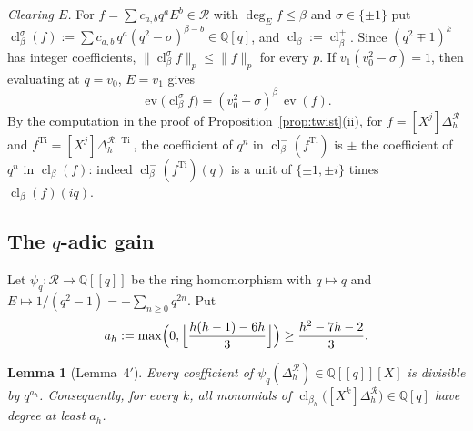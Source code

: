 \documentclass[11pt]{amsart}
\newtheorem{lemma}[theorem]{Lemma}
\theoremstyle{definition}
\theoremstyle{remark}
\numberwithin{equation}{section}
\newcommand{\QQ}{\mathbb{Q}}
\newcommand{\cR}{\mathcal{R}}
\newcommand{\Ti}{\operatorname{Ti}}
\newcommand{\Ed}{\deg_E}
\newcommand{\cl}{\operatorname{cl}}
\newcommand{\ev}{\operatorname{ev}}
\begin{document}
\emph{Clearing $E$.} For $f=\sum c_{a,b}q^aE^b\in\cR$ with $\Ed f\le\beta$ and $\sigma\in\{\pm1\}$ put
$\cl^\sigma_\beta(f):=\sum c_{a,b}\,q^a(q^2-\sigma)^{\beta-b}\in\QQ[q]$, and $\cl_\beta:=\cl^{+}_\beta$. Since
$(q^2\mp1)^k$ has integer coefficients, $\|\cl^\sigma_\beta f\|_p\le\|f\|_p$ for every $p$. If $v_1(v_0^2-\sigma)=1$,
then evaluating at $q=v_0$, $E=v_1$ gives
\begin{equation}\label{eq:clear}
  \ev\bigl(\cl^\sigma_\beta f\bigr)=(v_0^2-\sigma)^\beta\,\ev(f).
\end{equation}
By the computation in the proof of Proposition~\ref{prop:twist}(ii), for $f=[X^j]\Delta^{\cR}_h$ and
$f^{\Ti}=[X^j]\Delta^{\cR,\Ti}_h$, the coefficient of $q^n$ in $\cl^{-}_{\beta}(f^{\Ti})$ is $\pm$ the coefficient of
$q^n$ in $\cl_\beta(f)$: indeed $\cl^{-}_{\beta}(f^{\Ti})(q)$ is a unit of $\{\pm1,\pm i\}$ times $\cl_\beta(f)(iq)$.

\subsection{The \texorpdfstring{$q$}{q}-adic gain}
Let $\psi_q\colon\cR\to\QQ[[q]]$ be the ring homomorphism with $q\mapsto q$ and $E\mapsto1/(q^2-1)=-\sum_{n\ge0}q^{2n}$. Put
\[
  a_h:=\max\Bigl(0,\Bigl\lfloor\frac{h(h-1)-6h}{3}\Bigr\rfloor\Bigr)\ge\frac{h^2-7h-2}{3} .
\]

\begin{lemma}[Lemma~4$'$]\label{lem:qadic}
Every coefficient of $\psi_q(\Delta^{\cR}_h)\in\QQ[[q]][X]$ is divisible by $q^{a_h}$. Consequently, for every $k$, all
monomials of $\cl_{\beta_h}\bigl([X^k]\Delta^{\cR}_h\bigr)\in\QQ[q]$ have degree at least $a_h$.
\end{lemma}
\end{document}
